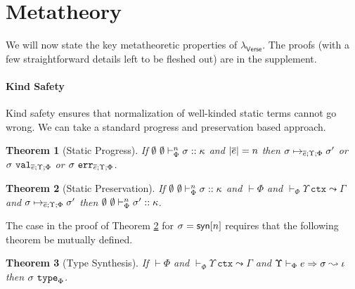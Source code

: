 \documentclass[preprint]{sigplanconf}
\newtheorem{theorem}{Theorem}
\newtheorem{lemma}{Lemma}
\begin{document}


\section{Metatheory}\label{metatheory}
\noindent We will now state the key metatheoretic properties of $\lambda_\textsf{Verse}$. The proofs (with a few straightforward details left to be fleshed out) are in the supplement. 

\paragraph{Kind Safety} Kind safety ensures that normalization of well-kinded static terms cannot go wrong. We can take a standard progress and preservation based approach. 
\begin{theorem}[Static Progress]\label{thm:static-progress}
If $\emptyset~\emptyset \vdash_{\Phi}^{n} \sigma :: \kappa$ and $|\overline{e}|=n$ then $\sigma \mapsto_{\overline{e}; \Upsilon; \Phi} \sigma'$ or $\sigma~\mathtt{val}_{\overline{e}; \Upsilon; \Phi}$ or $\sigma~\mathtt{err}_{\overline{e}; \Upsilon; \Phi}$.
\end{theorem}

\begin{theorem}[Static Preservation]\label{thm:static-preservation}
If $\emptyset~\emptyset \vdash_{\Phi}^{n} \sigma :: \kappa$ and $\vdash \Phi$ and $\vdash_\Phi \Upsilon~\mathtt{ctx} \leadsto \Gamma$ and $\sigma \mapsto_{\overline{e}; \Upsilon; \Phi} \sigma'$ then $\emptyset~\emptyset \vdash_{\Phi}^{n} \sigma' :: \kappa$.
\end{theorem}\noindent
The case in the proof of Theorem \ref{thm:static-preservation} for $\sigma={\sf syn}[n]$ requires that the following theorem be mutually defined. %
\begin{theorem}[Type Synthesis]
If $\vdash \Phi$ and $\vdash_\Phi \Upsilon~\mathtt{ctx} \leadsto \Gamma$ and $\Upsilon \vdash_{\Phi} e \Rightarrow \sigma \leadsto \iota$ then $\sigma~\mathtt{type}_\Phi$. 
\end{theorem}
\end{document}
